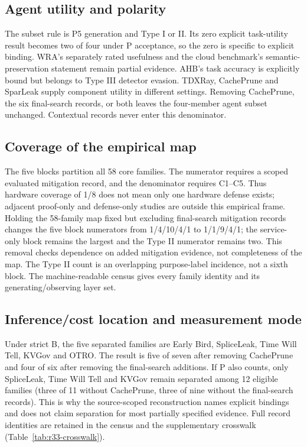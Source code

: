 \subsection{Agent utility and polarity}

The subset rule is P5 generation and Type I or II. Its zero explicit task-utility result becomes two of four under P acceptance, so the zero is specific to explicit binding. WRA's separately rated usefulness and the cloud benchmark's semantic-preservation statement remain partial evidence. AHB's task accuracy is explicitly bound but belongs to Type III detector evasion. TDXRay, CachePrune and SparLeak supply component utility in different settings. Removing CachePrune, the six final-search records, or both leaves the four-member agent subset unchanged. Contextual records never enter this denominator.

\subsection{Coverage of the empirical map}

The five blocks partition all 58 core families. The numerator requires a scoped evaluated mitigation record, and the denominator requires C1--C5. Thus hardware coverage of 1/8 does not mean only one hardware defense exists; adjacent proof-only and defense-only studies are outside this empirical frame. Holding the 58-family map fixed but excluding final-search mitigation records changes the five block numerators from 1/4/10/4/1 to 1/1/9/4/1; the service-only block remains the largest and the Type II numerator remains two. This removal checks dependence on added mitigation evidence, not completeness of the map. The Type II count is an overlapping purpose-label incidence, not a sixth block. The machine-readable census gives every family identity and its generating/observing layer set.

\subsection{Inference/cost location and measurement mode}

Under strict B, the five separated families are Early Bird, SpliceLeak, Time Will Tell, KVGov and OTRO. The result is five of seven after removing CachePrune and four of six after removing the final-search additions. If P also counts, only SpliceLeak, Time Will Tell and KVGov remain separated among 12 eligible families (three of 11 without CachePrune, three of nine without the final-search records). This is why the source-scoped reconstruction names explicit bindings and does not claim separation for most partially specified evidence. Full record identities are retained in the census and the supplementary crosswalk (Table~\ref{tab:r33-crosswalk}).

